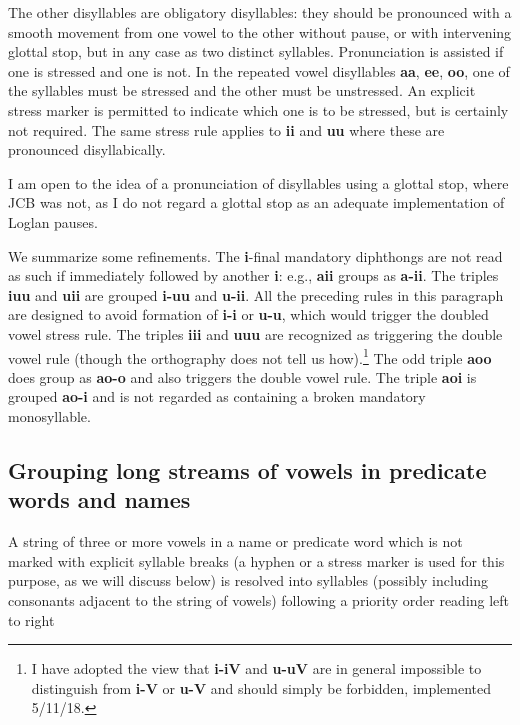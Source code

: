 \documentclass[12pt]{book}
\begin{document}
The other disyllables are obligatory disyllables:  they should be pronounced with a smooth movement from one vowel to the other without pause, or with intervening glottal stop, but in any case as two distinct syllables.   Pronunciation is assisted if one is stressed and one is not.   In the repeated vowel disyllables {\bf aa}, {\bf ee}, {\bf oo}, one of the syllables must be stressed and the other must be unstressed.  An explicit stress marker is permitted to indicate which one is to be stressed, but is certainly not required.  The same stress rule applies to {\bf ii} and {\bf uu} where these are pronounced disyllabically.  

I am open to the idea of a pronunciation of disyllables using a glottal stop, where JCB was not, as I do not regard a glottal stop as an adequate implementation of Loglan pauses.

We summarize some refinements.  The {\bf i}-final mandatory diphthongs are not read as such if immediately followed by another {\bf i}:  e.g.,
{\bf aii} groups as {\bf a-ii}.  The triples {\bf iuu} and {\bf uii} are grouped {\bf i-uu} and {\bf u-ii}.   All the preceding rules in this paragraph are designed to avoid formation of {\bf i-i} or {\bf u-u}, which would trigger the doubled vowel stress rule. The triples {\bf iii} and {\bf uuu} are recognized
as triggering the double vowel rule (though the orthography does not tell us how).\footnote{I have adopted the view that {\bf i-iV} and {\bf u-uV} are in general impossible to distinguish from  {\bf i-V} or {\bf u-V} and should simply be forbidden, implemented 5/11/18.}   The odd triple {\bf aoo} does group as {\bf ao-o} and also 
triggers the double vowel rule.  The triple {\bf aoi} is grouped {\bf ao-i} and is not regarded as containing a broken mandatory monosyllable.


\subsection{Grouping long streams of vowels in predicate words and names}

A string of three or more vowels  in a name or predicate word which is not marked with explicit syllable breaks (a hyphen or a stress marker is used for this purpose, as we will discuss below) is resolved into syllables (possibly including consonants adjacent to the string of vowels)  following a priority order reading left to right  
\end{document}
